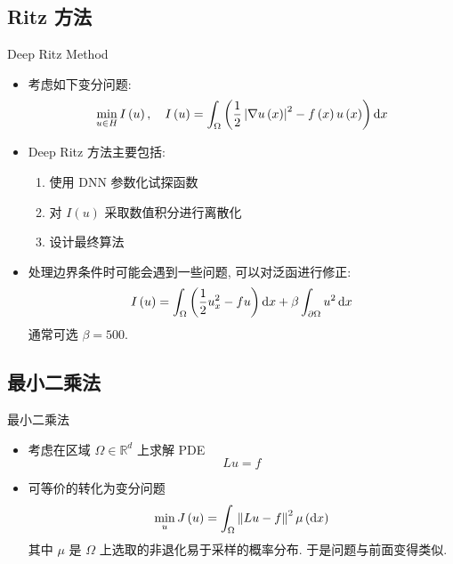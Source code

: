 \documentclass[aspectratio=169]{beamer}
\def\dif{\mathinner{\mathrm{d}}\hphantom{\mskip-\thinmuskip}}
\begin{document}
	\subsection{Ritz 方法}
	\begin{frame}{Deep Ritz Method}
		\begin{itemize}
			\item 考虑如下变分问题:
				\begin{equation*}
					\min_{u \in H}I\left(u\right), \quad I\left(u\right) = \int_{\Omega}\left(\frac{1}{2}\left\lvert\nabla u\left(x\right)\right\rvert^{2} - f\left(x\right)u\left(x\right)\right) \dif x
				\end{equation*}
			\item Deep Ritz 方法主要包括:
				\begin{enumerate}
					\item 使用 DNN 参数化试探函数
					\item 对 $I\left(u\right)$ 采取数值积分进行离散化
					\item 设计最终算法
				\end{enumerate}
			\item 处理边界条件时可能会遇到一些问题, 可以对泛函进行修正:
				\begin{equation*}
					I\left(u\right) = \int_{\Omega}\left(\frac{1}{2} u_{x}^{2} - fu\right) \dif x + \beta\int_{\partial\Omega}u^{2} \dif x
				\end{equation*}
				通常可选 $\beta = 500$.
		\end{itemize}
	\end{frame}

	\subsection{最小二乘法}
	\begin{frame}{最小二乘法}
		\begin{itemize}
			\item 考虑在区域 $\Omega \in \mathbb{R}^{d}$ 上求解 PDE
				\begin{equation*}
					Lu=f
				\end{equation*}
			\item 可等价的转化为变分问题
				\begin{equation*}
					\min_{u} J\left(u\right) = \int_{\Omega}\left\lVert Lu - f\right\rVert^{2}\mu\left(\dif x\right)
				\end{equation*}
				其中 $\mu$ 是 $\Omega$ 上选取的非退化易于采样的概率分布. 于是问题与前面变得类似.
		\end{itemize}
	\end{frame}
\end{document}
